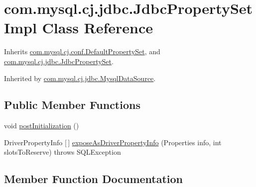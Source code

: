\hypertarget{classcom_1_1mysql_1_1cj_1_1jdbc_1_1_jdbc_property_set_impl}{}\section{com.\+mysql.\+cj.\+jdbc.\+Jdbc\+Property\+Set\+Impl Class Reference}
\label{classcom_1_1mysql_1_1cj_1_1jdbc_1_1_jdbc_property_set_impl}


Inherits \mbox{\hyperlink{classcom_1_1mysql_1_1cj_1_1conf_1_1_default_property_set}{com.\+mysql.\+cj.\+conf.\+Default\+Property\+Set}}, and \mbox{\hyperlink{interfacecom_1_1mysql_1_1cj_1_1jdbc_1_1_jdbc_property_set}{com.\+mysql.\+cj.\+jdbc.\+Jdbc\+Property\+Set}}.



Inherited by \mbox{\hyperlink{classcom_1_1mysql_1_1cj_1_1jdbc_1_1_mysql_data_source}{com.\+mysql.\+cj.\+jdbc.\+Mysql\+Data\+Source}}.

\subsection*{Public Member Functions}
\begin{DoxyCompactItemize}
\item 
void \mbox{\hyperlink{classcom_1_1mysql_1_1cj_1_1jdbc_1_1_jdbc_property_set_impl_a2a59c7314cac752f363503d96a4b45fc}{post\+Initialization}} ()
\item 
Driver\+Property\+Info \mbox{[}$\,$\mbox{]} \mbox{\hyperlink{classcom_1_1mysql_1_1cj_1_1jdbc_1_1_jdbc_property_set_impl_a0bcb782acac24d633f1c6b5108102dcd}{expose\+As\+Driver\+Property\+Info}} (Properties info, int slots\+To\+Reserve)  throws S\+Q\+L\+Exception 
\end{DoxyCompactItemize}


\subsection{Member Function Documentation}
\mbox{\label{classcom_1_1mysql_1_1cj_1_1jdbc_1_1_jdbc_property_set_impl_a0bcb782acac24d633f1c6b5108102dcd}} 
